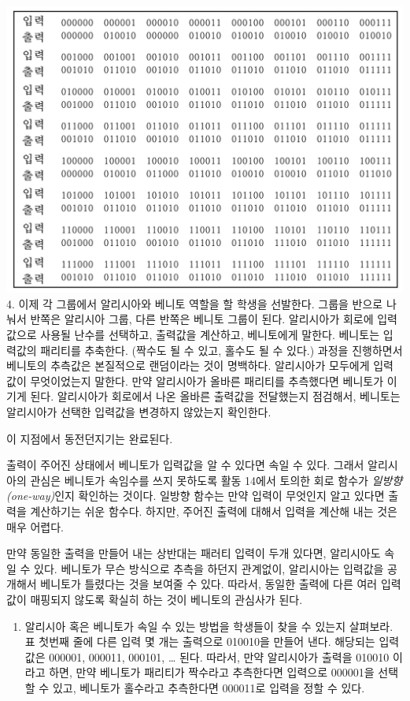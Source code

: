 \documentclass[]{article}
\begin{document}
\includegraphics{csunplugged/05-part/img/ch18-crypto/17-crypto-05-input-output.png}
4. 이제 각 그룹에서 알리시아와 베니토 역할을 할 학생을 선발한다. 그룹을
반으로 나눠서 반쪽은 알리시아 그룹, 다른 반쪽은 베니토 그룹이 된다.
알리시아가 회로에 입력값으로 사용될 난수를 선택하고, 출력값을 계산하고,
베니토에게 말한다. 베니토는 입력값의 패리티를 추축한다. (짝수도 될 수
있고, 홀수도 될 수 있다.) 과정을 진행하면서 베니토의 추측값은 본질적으로
랜덤이라는 것이 명백하다. 알리시아가 모두에게 입력값이 무엇이었는지
말한다. 만약 알리시아가 올바른 패리티를 추측했다면 베니토가 이기게 된다.
알리시아가 회로에서 나온 올바른 출력값을 전달했는지 점검해서, 베니토는
알리시아가 선택한 입력값을 변경하지 않았는지 확인한다.

이 지점에서 동전던지기는 완료된다.

출력이 주어진 상태에서 베니토가 입력값을 알 수 있다면 속일 수 있다.
그래서 알리시아의 관심은 베니토가 속임수를 쓰지 못하도록 활동 14에서
토의한 회로 함수가 \emph{일방향(one-way)}인지 확인하는 것이다. 일방향
함수는 만약 입력이 무엇인지 알고 있다면 출력을 계산하기는 쉬운 함수다.
하지만, 주어진 출력에 대해서 입력을 계산해 내는 것은 매우 어렵다.

만약 동일한 출력을 만들어 내는 상반대는 패러티 입력이 두개 있다면,
알리시아도 속일 수 있다. 베니토가 무슨 방식으로 추측을 하던지 관계없이,
알리시아는 입력값을 공개해서 베니토가 틀렸다는 것을 보여줄 수 있다.
따라서, 동일한 출력에 다른 여러 입력값이 매핑되지 않도록 확실히 하는
것이 베니토의 관심사가 된다.

\begin{enumerate}
\itemsep1pt\parskip0pt
\item
  알리시아 혹은 베니토가 속일 수 있는 방법을 학생들이 찾을 수 있는지
  살펴보라. 표 첫번째 줄에 다른 입력 몇 개는 출력으로 010010을 만들어
  낸다. 해당되는 입력값은 000001, 000011, 000101, \ldots{} 된다. 따라서,
  만약 알리시아가 출력을 010010 이라고 하면, 만약 베니토가 패리티가
  짝수라고 추측한다면 입력으로 000001을 선택할 수 있고, 베니토가
  홀수라고 추측한다면 000011로 입력을 정할 수 있다.
\end{enumerate}
\end{document}

